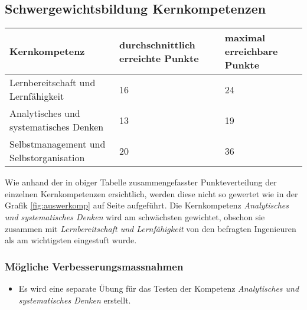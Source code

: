 \subsection{Schwergewichtsbildung Kernkompetenzen}
\begin{center}
  \begin{tabular}{ | p{7cm} | p{3cm} | p{3cm} |}
   \hline
   \textbf{Kernkompetenz} & \textbf{durchschnittlich erreichte Punkte} & \textbf{maximal erreichbare Punkte} \\ \hline
   Lernbereitschaft und Lernfähigkeit & 16 & 24\\ \hline
   Analytisches und systematisches Denken & 13 & 19\\ \hline
   Selbstmanagement und Selbstorganisation & 20 & 36\\ \hline
  \end{tabular}
\end{center}
Wie anhand der in obiger Tabelle zusammengefasster Punkteverteilung der einzelnen Kernkompetenzen ersichtlich, werden diese nicht so gewertet wie in der Grafik \ref{fig:auswerkomp} auf Seite \pageref{fig:auswerkomp} aufgeführt. Die Kernkompetenz \textit{Analytisches und systematisches Denken} wird am schwächsten gewichtet, obschon sie zusammen mit \textit{Lernbereitschaft und Lernfähigkeit} von den befragten Ingenieuren als am wichtigsten eingestuft wurde.
\subsubsection{Mögliche Verbesserungsmassnahmen}
\begin{itemize}
\item Es wird eine separate Übung für das Testen der Kompetenz \textit{Analytisches und systematisches Denken} erstellt.
\end{itemize}

